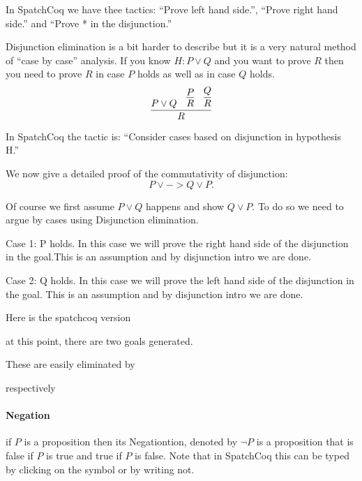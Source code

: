 In SpatchCoq we have thee tactics: ``Prove left hand side.'', ``Prove right hand side.'' and 
``Prove * in the disjunction.''

Disjunction elimination is a bit harder to describe but it is a very natural method of ``case by case'' analysis. If you know $H: P\lor Q$ and you  want to prove $R$ then you need to prove $R$ in case $P$ holds as well as in case $Q$ holds.
$$\infer{R}{P\lor Q &\infer{R}{P} & \infer{R}{Q}}$$

In SpatchCoq the tactic is: ``Consider cases based on disjunction in hypothesis H.''

We now give a detailed proof of the commutativity of disjunction:
$$P\lor ->Q\lor P.$$ 

Of course we first assume $P\lor Q$ happens and show $Q \lor P$. To do so we need to argue by cases using Disjunction elimination.

Case 1: P holds. In this case we will prove the right hand side of the disjunction in the goal.This is an assumption and by disjunction intro we are done.

Case 2: Q holds. In this case we will prove the left hand side of the disjunction in the goal. This is an assumption  and by disjunction intro we are done.

Here is the spatchcoq version


at this point, there are two goals generated.


These are easily eliminated by

respectively 


\paragraph{\bf Negation}
if $P$ is a proposition then its Negationtion, denoted by $\neg P$ is a proposition that is  false if  $P$ is true and true if $P$ is false. Note that in SpatchCoq this can be typed by clicking on the symbol or by writing not.

